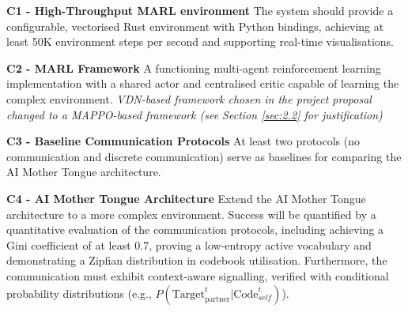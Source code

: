 

\textbf{C1 - High-Throughput MARL environment}
The system should provide a configurable, vectorised Rust environment with Python bindings, achieving at least 50K environment steps per second and supporting real-time visualisations.

\textbf{C2 - MARL Framework}
A functioning multi-agent reinforcement learning implementation with a shared actor and centralised critic capable of learning the complex environment.
\textit{VDN-based framework chosen in the project proposal changed to a MAPPO-based framework (see Section \ref{sec:2.2} for justification)}

\textbf{C3 - Baseline Communication Protocols}
At least two protocols (no communication and discrete communication) serve as baselines for comparing the AI Mother Tongue architecture.

\textbf{C4 - AI Mother Tongue Architecture}
Extend the AI Mother Tongue architecture to a more complex environment.
Success will be quantified by a quantitative evaluation of the communication protocols, including achieving a Gini coefficient of at least 0.7, proving a low-entropy active vocabulary and demonstrating a Zipfian distribution in codebook utilisation.
Furthermore, the communication must exhibit context-aware signalling, verified with conditional probability distributions (e.g., $P(\text{Target}_{\text{partner}}^{t} | \text{Code}_{self}^t)$).

